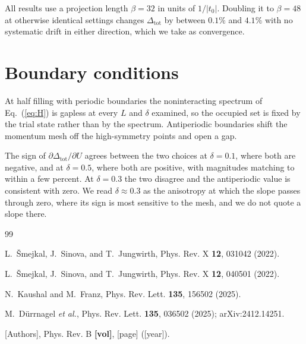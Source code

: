 \documentclass[aps,prb,reprint,superscriptaddress,amsmath,amssymb,floatfix]{revtex4-2}
\begin{document}
All results use a projection length $\beta = 32$ in units of $1/|t_0|$. Doubling
it to $\beta = 48$ at otherwise identical settings changes
$\Delta_{\mathrm{tot}}$ by between $0.1\%$ and $4.1\%$ with no systematic drift
in either direction, which we take as convergence.


\section{Boundary conditions}
\label{app:bc}

At half filling with periodic boundaries the noninteracting spectrum of
Eq.~(\ref{eq:H}) is gapless at every $L$ and $\delta$ examined, so the occupied
set is fixed by the trial state rather than by the spectrum. Antiperiodic
boundaries shift the momentum mesh off the high-symmetry points and open a gap.

The sign of $\partial \Delta_{\mathrm{tot}} / \partial U$ agrees between the two
choices at $\delta = 0.1$, where both are negative, and at $\delta = 0.5$, where
both are positive, with magnitudes matching to within a few percent. At
$\delta = 0.3$ the two disagree and the antiperiodic value is consistent with
zero. We read $\delta \approx 0.3$ as the anisotropy at which the slope passes
through zero, where its sign is most sensitive to the mesh, and we do not quote
a slope there.

\begin{acknowledgments}
\end{acknowledgments}

\begin{thebibliography}{99}


L.~\v{S}mejkal, J.~Sinova, and T.~Jungwirth,
Phys. Rev. X \textbf{12}, 031042 (2022).

L.~\v{S}mejkal, J.~Sinova, and T.~Jungwirth,
Phys. Rev. X \textbf{12}, 040501 (2022).

N.~Kaushal and M.~Franz,
Phys. Rev. Lett. \textbf{135}, 156502 (2025).

M.~D\"urrnagel \textit{et al.},
Phys. Rev. Lett. \textbf{135}, 036502 (2025);
arXiv:2412.14251.

[Authors], Phys. Rev. B \textbf{[vol]}, [page] ([year]).

\end{thebibliography}
\end{document}
